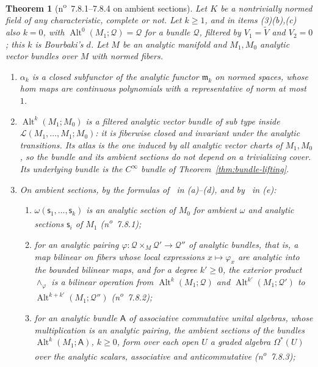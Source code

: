 \documentclass[11pt]{amsart}
\newtheorem{theorem}{Theorem}[section]
\theoremstyle{definition}
\theoremstyle{remark}
\numberwithin{equation}{section}
\newcommand{\cL}{\mathcal L}
\newcommand{\Alt}{\operatorname{Alt}}
\theoremstyle{plain}
\theoremstyle{definition}
\theoremstyle{plain}
\begin{document}
\begin{theorem}[n\textsuperscript{o}~7.8.1--7.8.4 on ambient sections]\label{amb:thm:seven-eight}
Let $K$ be a nontrivially normed field of any characteristic, complete or not. Let $k\ge1$, and in items \textup{(3)(b),(c)} also $k=0$, with $\Alt^0(M_1;\mathcal Q)=\mathcal Q$ for a bundle $\mathcal Q$, filtered by $V_1=\tilde V$ and $V_2=0$; this $k$ is Bourbaki's $d$. Let $M$ be an analytic manifold and $M_1,M_0$ analytic vector bundles over $M$ with normed fibers.
\begin{enumerate}
\item $\alpha_k$ is a closed subfunctor of the analytic functor $\mathfrak m_k$ on normed spaces, whose hom maps are continuous polynomials with a representative of norm at most $1$.
\item $\Alt^k(M_1;M_0)$ is a filtered analytic vector bundle of sub type inside $\cL(M_1,\dots,M_1;M_0)$: it is fiberwise closed and invariant under the analytic transitions. Its atlas is the one induced by all analytic vector charts of $M_1,M_0$, so the bundle and its ambient sections do not depend on a trivializing cover. Its underlying bundle is the $C^\infty$ bundle of Theorem~\ref{thm:bundle-lifting}.
\item On ambient sections, by the formulas of~\cite[n\textsuperscript{o}~7.8]{Bou} in \textup{(a)--(d)}, and by~\cite[n\textsuperscript{o}~7.6.3]{Bou} in \textup{(e)}:
\begin{enumerate}
\item $\omega(\mathsf s_1,\dots,\mathsf s_k)$ is an analytic section of $M_0$ for ambient $\omega$ and analytic sections $\mathsf s_i$ of $M_1$ (n\textsuperscript{o}~7.8.1);
\item for an \emph{analytic pairing} $\varphi\colon\mathcal Q\times_M\mathcal Q'\to\mathcal Q''$ of analytic bundles, that is, a map bilinear on fibers whose local expressions $x\mapsto\varphi_x$ are analytic into the bounded bilinear maps, and for a degree $k'\ge0$, the exterior product $\wedge_\varphi$ is a bilinear operation from $\Alt^k(M_1;\mathcal Q)$ and $\Alt^{k'}(M_1;\mathcal Q')$ to $\Alt^{k+k'}(M_1;\mathcal Q'')$ (n\textsuperscript{o}~7.8.2);
\item for an analytic bundle $\mathsf A$ of associative commutative unital algebras, whose multiplication is an analytic pairing, the ambient sections of the bundles $\Alt^k(M_1;\mathsf A)$, $k\ge0$, form over each open $U$ a graded algebra $\Omega^*(U)$ over the analytic scalars, associative and anticommutative (n\textsuperscript{o}~7.8.3);

\end{enumerate}
\end{enumerate}
\end{theorem}
\end{document}
